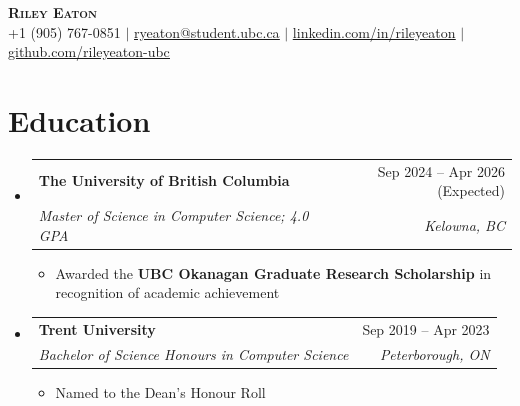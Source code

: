 \documentclass[letterpaper,10pt]{article}
\makeatletter
\newcommand{\resumeItem}[1]{
  \item\small{
    {#1 \vspace{-2pt}}
  }
}
\newcommand{\resumeSubheading}[4]{
  \vspace{-0.9pt}\item
    \begin{tabular*}{0.97\textwidth}[t]{l@{\extracolsep{\fill}}r}
      \textbf{\small#1} & \small#2 \\
      \textit{\small#3} & \textit{\small #4} \\
    \end{tabular*}\vspace{-7pt}
}
\newcommand{\resumeSubHeadingListStart}{\begin{itemize}[leftmargin=0.15in, label={}]}
\newcommand{\resumeSubHeadingListEnd}{\end{itemize}}
\newcommand{\resumeItemListStart}{\begin{itemize}}
\newcommand{\resumeItemListEnd}{\end{itemize}\vspace{-5pt}}
\def\iconSpace{0.5pt}
\makeatother
\begin{document}
\begin{center}
    \fontsize{18}{18}\textbf{\scshape Riley Eaton} \\ \vspace{2pt}
    \small \faPhoneSquare \hspace{\iconSpace} +1 (905) 767-0851
    $|$ \faEnvelope \hspace{\iconSpace} \underline{\href{mailto:ryeaton@student.ubc.ca}{ryeaton@student.ubc.ca}}
    $|$ \faLinkedinSquare \hspace{\iconSpace} \underline{\href{https://linkedin.com/in/rileyeaton}{linkedin.com/in/rileyeaton}}
    $|$ \faGithub \hspace{\iconSpace} \underline{\href{https://github.com/rileyeaton-ubc}{github.com/rileyeaton-ubc}}
\end{center}

\section{Education}
  \resumeSubHeadingListStart
    \resumeSubheading
      {The University of British Columbia}{Sep 2024 -- Apr 2026 (Expected)}
      {Master of Science in Computer Science; 4.0 GPA}{Kelowna, BC}
      \resumeItemListStart
        \resumeItem{Awarded the \textbf{UBC Okanagan Graduate Research Scholarship} in recognition of academic achievement}
      \resumeItemListEnd
    \resumeSubheading
      {Trent University}{Sep 2019 -- Apr 2023}
      {Bachelor of Science Honours in Computer Science}{Peterborough, ON}
      \resumeItemListStart
        \resumeItem{Named to the Dean's Honour Roll}
      \resumeItemListEnd
  \resumeSubHeadingListEnd

\end{document}
